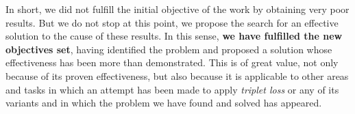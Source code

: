 In short, we did not fulfill the initial objective of the work by obtaining very poor results. But we do not stop at this point, we propose the search for an effective solution to the cause of these results. In this sense, \textbf{we have fulfilled the new objectives set}, having identified the problem and proposed a solution whose effectiveness has been more than demonstrated. This is of great value, not only because of its proven effectiveness, but also because it is applicable to other areas and tasks in which an attempt has been made to apply \textit{triplet loss} or any of its variants and in which the problem we have found and solved has appeared.

\endinput
